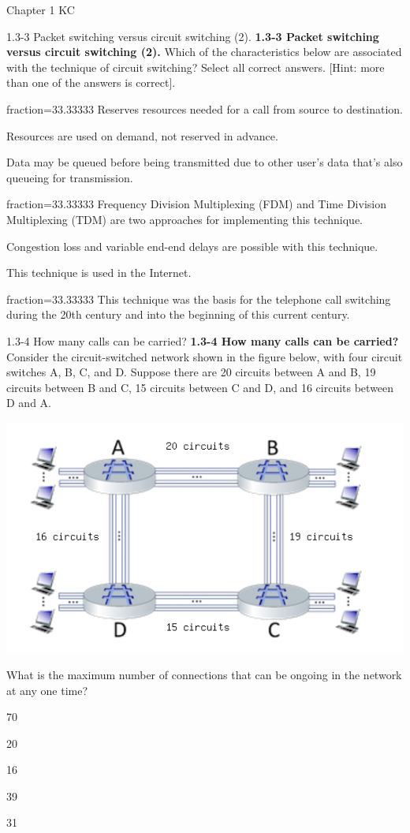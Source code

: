 \documentclass[a4paper]{article}
\begin{document}
\begin{quiz}{Chapter 1 KC}
\begin{multi}[points=1,shuffle=true,multiple]{1.3-3 Packet switching versus circuit switching (2).}
\textbf{1.3-3 Packet switching versus circuit switching (2).} 
Which of the characteristics below are associated with the technique of circuit switching? Select all correct answers. [Hint: more than one of the answers is correct].
\item[fraction=33.33333] Reserves resources needed for a call from source to destination.
\item Resources are used on demand, not reserved in advance.
\item Data may be queued before being transmitted due to other user's data that's also queueing for transmission.
\item[fraction=33.33333] Frequency Division Multiplexing (FDM) and Time Division Multiplexing (TDM) are two approaches for implementing this technique.
\item Congestion loss and variable end-end delays are possible with this technique.
\item This technique is used in the Internet.
\item[fraction=33.33333] This technique was the basis for the telephone call switching during the 20th century and into the beginning of this current century.
\end{multi}

\begin{multi}[points=1,shuffle=true]{1.3-4 How many calls can be carried?}
\textbf{1.3-4 How many calls can be carried?} 
Consider the circuit-switched network shown in the figure below, with four circuit switches A, B, C, and D. Suppose there are 20 circuits between A and B, 19 circuits between B and C, 15 circuits between C and D, and 16 circuits between D and A. 
\begin{center}
\includegraphics[width=\linewidth]{figs/1.3.4.png}
\end{center}
What is the maximum number of connections that can be ongoing in the network at any one time?
\item* 70
\item 20
\item 16
\item 39
\item 31
\end{multi}


\end{quiz}
\end{document}
